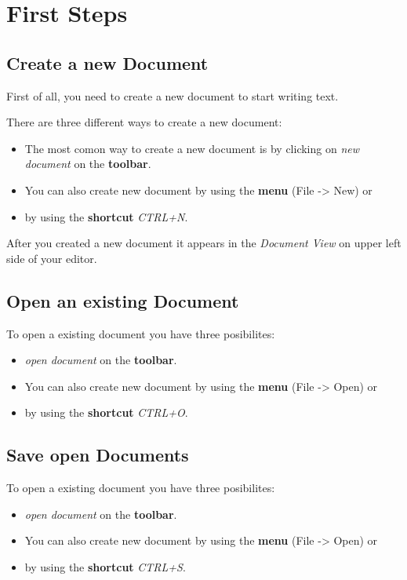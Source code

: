 \documentclass[11pt,a4paper]{article}
\begin{document}
\newpage
\section{First Steps}

\subsection{Create a new Document}
First of all, you need to create a new document to start writing text.

There are three different ways to create a new document:
\begin{itemize}
\item The most comon way to create a new document is by clicking on \textit{new document} on the \textbf{toolbar}.
\item You can also create new document by using the \textbf{menu} (File -> New) or
\item by using the \textbf{shortcut} \textit{CTRL+N}.
\end{itemize}

After you created a new document it appears in the \textit{Document View} on upper left side of your editor.

\subsection{Open an existing Document}
To open a existing document you have three posibilites:
\begin{itemize}
\item \textit{open document} on the \textbf{toolbar}.
\item You can also create new document by using the \textbf{menu} (File -> Open) or
\item by using the \textbf{shortcut} \textit{CTRL+O}.
\end{itemize}

\subsection{Save open Documents}

To open a existing document you have three posibilites:
\begin{itemize}
\item \textit{open document} on the \textbf{toolbar}.
\item You can also create new document by using the \textbf{menu} (File -> Open) or
\item by using the \textbf{shortcut} \textit{CTRL+S}.
\end{itemize}
\end{document}
